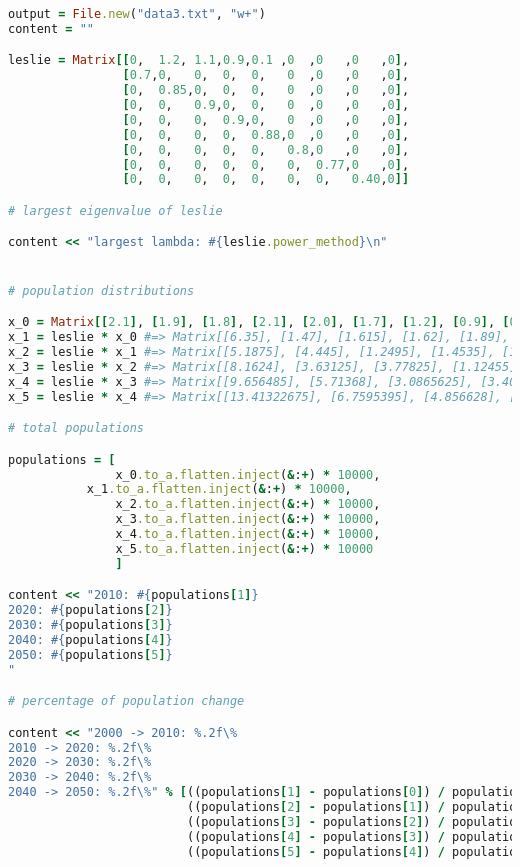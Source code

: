 \documentclass[letterpaper,12pt]{article}
\begin{document}
\lstset{caption=Populations}
\begin{lstlisting}[language=ruby]
output = File.new("data3.txt", "w+")
content = ""

leslie = Matrix[[0,  1.2, 1.1,0.9,0.1 ,0  ,0   ,0   ,0],
                [0.7,0,   0,  0,  0,   0  ,0   ,0   ,0],
                [0,  0.85,0,  0,  0,   0  ,0   ,0   ,0],
                [0,  0,   0.9,0,  0,   0  ,0   ,0   ,0],
                [0,  0,   0,  0.9,0,   0  ,0   ,0   ,0],
                [0,  0,   0,  0,  0.88,0  ,0   ,0   ,0],
                [0,  0,   0,  0,  0,   0.8,0   ,0   ,0],
                [0,  0,   0,  0,  0,   0,  0.77,0   ,0],
                [0,  0,   0,  0,  0,   0,  0,   0.40,0]]

# largest eigenvalue of leslie

content << "largest lambda: #{leslie.power_method}\n"


# population distributions

x_0 = Matrix[[2.1], [1.9], [1.8], [2.1], [2.0], [1.7], [1.2], [0.9], [0.5]]
x_1 = leslie * x_0 #=> Matrix[[6.35], [1.47], [1.615], [1.62], [1.89], [1.76], [1.36], [0.924], [0.36]]
x_2 = leslie * x_1 #=> Matrix[[5.1875], [4.445], [1.2495], [1.4535], [1.458], [1.6632], [1.408], [1.0472], [0.3696]]
x_3 = leslie * x_2 #=> Matrix[[8.1624], [3.63125], [3.77825], [1.12455], [1.30815], [1.28304], [1.33056], [1.08416], [0.41888]]
x_4 = leslie * x_3 #=> Matrix[[9.656485], [5.71368], [3.0865625], [3.400425], [1.012095], [1.151172], [1.026432], [1.0245312], [0.433664]]
x_5 = leslie * x_4 #=> Matrix[[13.41322675], [6.7595395], [4.856628], [2.77790625], [3.0603825], [0.8906436], [0.9209376], [0.79035264], [0.40981248]]

# total populations

populations = [
               x_0.to_a.flatten.inject(&:+) * 10000,
	       x_1.to_a.flatten.inject(&:+) * 10000,
               x_2.to_a.flatten.inject(&:+) * 10000,
               x_3.to_a.flatten.inject(&:+) * 10000,
               x_4.to_a.flatten.inject(&:+) * 10000,
               x_5.to_a.flatten.inject(&:+) * 10000
			   ]

content << "2010: #{populations[1]}
2020: #{populations[2]}
2030: #{populations[3]}
2040: #{populations[4]}
2050: #{populations[5]}
"

# percentage of population change

content << "2000 -> 2010: %.2f\%
2010 -> 2020: %.2f\%
2020 -> 2030: %.2f\%
2030 -> 2040: %.2f\%
2040 -> 2050: %.2f\%" % [((populations[1] - populations[0]) / populations[0] * 100),
                         ((populations[2] - populations[1]) / populations[1] * 100),
                         ((populations[3] - populations[2]) / populations[2] * 100),
                         ((populations[4] - populations[3]) / populations[3] * 100),
                         ((populations[5] - populations[4]) / populations[4] * 100)]
\end{lstlisting}
\end{document}
